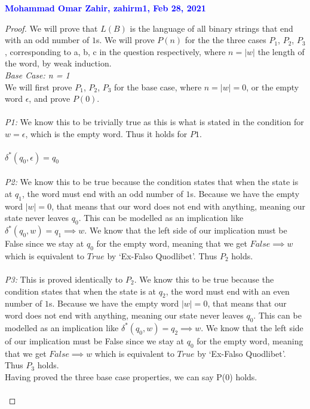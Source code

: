 \documentclass[11pt,fleqn]{article}
\newcommand{\eps}{\epsilon}
\begin{document}
   \textcolor{blue}{\textbf{Mohammad Omar Zahir, zahirm1, Feb 28, 2021}}\\
   \begin{proof}
   We will prove that $L(B)$ is the language of all binary strings that end
   with an odd number of $1$s. We will prove $P(n)$ for the the three cases $P_1$, $P_2$, $P_3$, corresponding to a, b, c in the question respectively, where $n = |w|$ the length of the word, by weak induction. \\
   
   \emph{Base Case: n = 1}\\
   We will first prove $P_1$, $P_2$, $P_3$ for the base case, where $n = |w| = 0$, or the empty word $\eps$, and prove $P(0)$.\\\\ 
   \emph{P1:}
   We know this to be trivially true as this is what is stated in the condition for $w = \eps$, which is the empty word. Thus it holds for $P1$.
   \\\\$\delta^*(q_0,\eps) = q_0$\\\\
   \emph{P2:}
   We know this to be true because the condition states that when the state is at $q_1$, the word must end with an odd number of $1$s. Because we have the empty word $|w| = 0$, that means that our word does not end with anything, meaning our state never leaves $q_0$. This can be modelled as an implication like $\delta^*(q_0,w) = q_1 \implies w$. We know that the left side of our implication must be False since we stay at $q_0$ for the empty word, meaning that we get $False \implies w$ which is equivalent to $True$ by `Ex-Falso Quodlibet'. Thus $P_2$ holds.\\\\
   \emph{P3:}
   This is proved identically to $P_2$. We know this to be true because the condition states that when the state is at $q_2$, the word must end with an even number of $1$s. Because we have the empty word $|w| = 0$, that means that our word does not end with anything, meaning our state never leaves $q_0$. This can be modelled as an implication like $\delta^*(q_0,w) = q_2 \implies w$. We know that the left side of our implication must be False since we stay at $q_0$ for the empty word, meaning that we get $False \implies w$ which is equivalent to $True$ by `Ex-Falso Quodlibet'. Thus $P_3$ holds.\\
   Having proved the three base case properties, we can say P(0) holds.\\\\

\end{proof}
\end{document}
